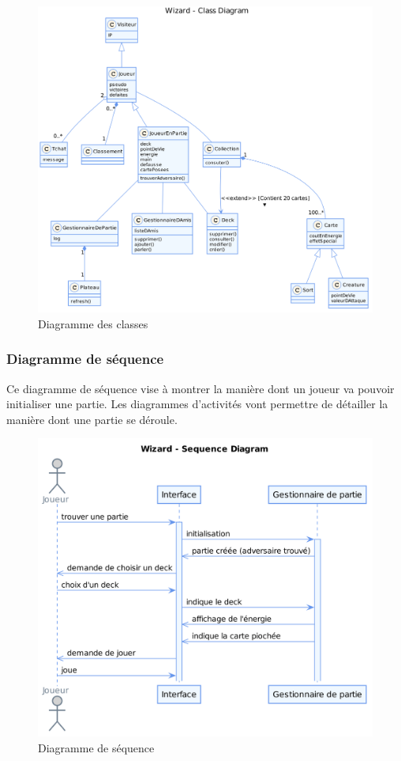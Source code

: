 \documentclass[11pt,a4paper]{article}
\begin{document}
\begin{figure}[ht]
  \centering
  \includegraphics[width=1\textwidth]{../uml_files/ClassDiagram.png}
  \caption{\label{fig:class} Diagramme des classes}
\end{figure}

\subsubsection{Diagramme de séquence}

Ce diagramme de séquence vise à montrer la manière dont un joueur va
pouvoir initialiser une partie.  Les diagrammes d'activités vont
permettre de détailler la manière dont une partie se déroule.

\begin{figure}[ht]
  \centering
  \includegraphics[width=1\textwidth]{../uml_files/SequenceDiagram.png}
  \caption{\label{fig:seq} Diagramme de séquence}
\end{figure}
\end{document}
